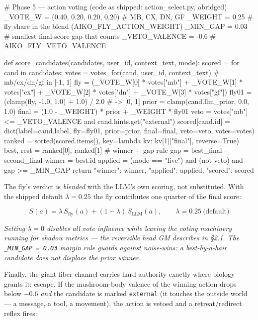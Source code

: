 \documentclass[11pt]{article}
\begin{document}
\begin{CodeBlock}
# Phase 5 — action voting (code as shipped: action_select.py, abridged)
_VOTE_W = (0.40, 0.20, 0.20, 0.20)      # MB, CX, DN, GF
_WEIGHT = 0.25                          # fly share in the blend (AIKO_FLY_ACTION_WEIGHT)
_MIN_GAP = 0.03                         # smallest final-score gap that counts
_VETO_VALENCE = -0.6                    # AIKO_FLY_VETO_VALENCE

def score_candidates(candidates, user_id, context_text, mode):
    scored = {}
    for cand in candidates:
        votes = votes_for(cand, user_id, context_text)   # mb/cx/dn/gf in [-1, 1]
        fly = (_VOTE_W[0] * votes["mb"] + _VOTE_W[1] * votes["cx"]
               + _VOTE_W[2] * votes["dn"] + _VOTE_W[3] * votes["gf"])
        fly01 = (clamp(fly, -1.0, 1.0) + 1.0) / 2.0       # -> [0, 1]
        prior = clamp(cand.llm_prior, 0.0, 1.0)
        final = (1.0 - _WEIGHT) * prior + _WEIGHT * fly01
        veto = votes["mb"] <= _VETO_VALENCE and cand.hints.get("external")
        scored[cand.id] = dict(label=cand.label, fly=fly01, prior=prior,
                               final=final, veto=veto, votes=votes)
    ranked = sorted(scored.items(), key=lambda kv: kv[1]["final"], reverse=True)
    best, rest = ranked[0], ranked[1]                     # winner + gap rule
    gap = best_final - second_final
    winner = best.id
    applied = (mode == "live") and (not veto) and gap >= _MIN_GAP
    return {"winner": winner, "applied": applied, "scored": scored}
\end{CodeBlock}

The fly's verdict is \emph{blended} with the LLM's own scoring, not substituted. With the shipped default \(\lambda = 0.25\) the fly contributes one quarter of the final score:

\begin{equation}
S(a) = \lambda\,S_{\mathrm{fly}}(a) + (1 - \lambda)\,S_{\mathrm{LLM}}(a),\qquad \lambda = 0.25\ \text{(default)}
\tag{2}
\end{equation}

\noindent\emph{Setting \(\lambda = 0\) disables all vote influence while leaving the voting machinery running for shadow metrics — the reversible head GM describes in §2.1. The \texttt{\_MIN\_GAP = 0.03} margin rule guards against noise-wins: a best-by-a-hair candidate does not displace the prior winner.}

Finally, the giant-fiber channel carries hard authority exactly where biology grants it: escape. If the mushroom-body valence of the winning action drops below \(-0.6\) \emph{and} the candidate is marked \texttt{external} (it touches the outside world — a message, a tool, a movement), the action is vetoed and a retreat/redirect reflex fires:
\end{document}
